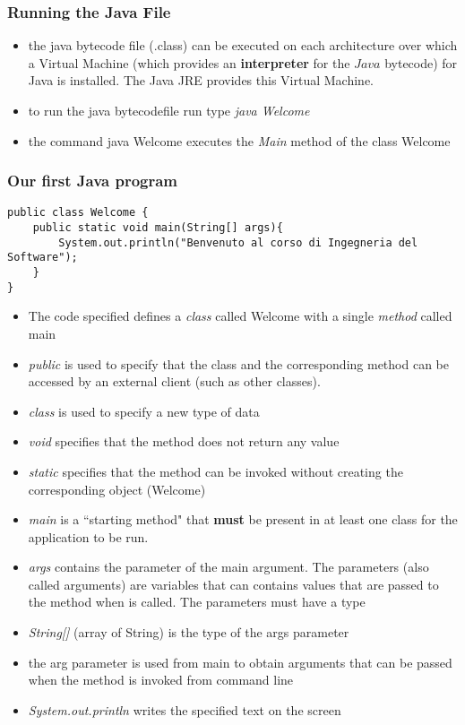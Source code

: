 \documentclass{article}
\theoremstyle{definition}
\begin{document}
\subsubsection{Running the Java File}
\begin{itemize}
\item the java bytecode file (.class) can be executed on each architecture over which a Virtual Machine (which provides an \textbf{interpreter} for the $Java$ bytecode) for Java is installed. The Java JRE provides this Virtual Machine.
\item to run the java bytecodefile run type \emph{java Welcome}
\item the command java Welcome executes the \emph{Main} method of the class Welcome
\end{itemize}

\subsubsection{Our first Java program}
\begin{lstlisting}
public class Welcome {	
    public static void main(String[] args){	
	 	System.out.println("Benvenuto al corso di Ingegneria del Software");
    }
}
\end{lstlisting}
\begin{itemize}
\item The code specified defines a \emph{class} called Welcome with a single \emph{method} called main
\item \emph{public} is used to specify that the class and the corresponding method can be accessed by an external client (such as other classes).
\item \emph{class} is used to specify a new type of data
\item \emph{void} specifies that the method does not return any value
\item \emph{static} specifies that the method can be invoked without creating the corresponding object (Welcome)
\item \emph{main} is a ``starting method" that \textbf{must} be present in at least one class for the application to be run.
\item \emph{args} contains the parameter of the main argument. The parameters (also called arguments) are variables that can contains values that are passed to the method when is called. The parameters must have a type
\item \emph{String[]} (array of String) is the type of the args parameter 
\item the arg parameter is used from main to obtain arguments that can be passed when the method is invoked from command line
\item \emph{System.out.println} writes the specified text on the screen
\end{itemize}
\end{document}
